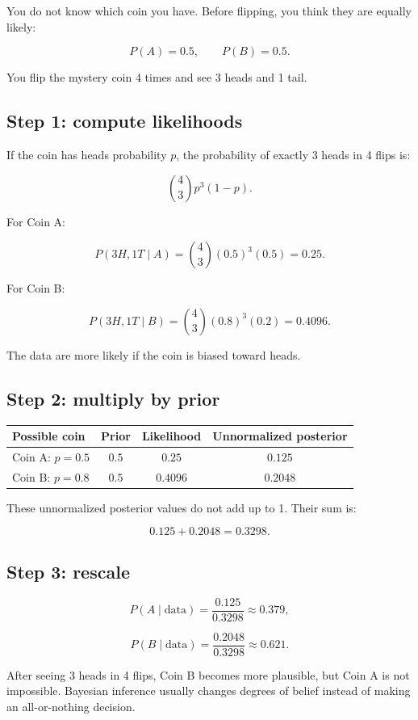 \documentclass[11pt]{article}
\newcommand{\data}{\text{data}}
\begin{document}
You do not know which coin you have. Before flipping, you think they are equally likely:

\[
P(A)=0.5, \qquad P(B)=0.5.
\]

You flip the mystery coin 4 times and see 3 heads and 1 tail.

\subsection*{Step 1: compute likelihoods}

If the coin has heads probability $p$, the probability of exactly 3 heads in 4 flips is:

\[
\binom{4}{3}p^3(1-p).
\]

For Coin A:

\[
P(3H,1T \mid A)=\binom{4}{3}(0.5)^3(0.5)=0.25.
\]

For Coin B:

\[
P(3H,1T \mid B)=\binom{4}{3}(0.8)^3(0.2)=0.4096.
\]

The data are more likely if the coin is biased toward heads.

\subsection*{Step 2: multiply by prior}

\begin{center}
\begin{tabular}{lccc}
\toprule
Possible coin & Prior & Likelihood & Unnormalized posterior \\
\midrule
Coin A: $p=0.5$ & $0.5$ & $0.25$ & $0.125$ \\
Coin B: $p=0.8$ & $0.5$ & $0.4096$ & $0.2048$ \\
\bottomrule
\end{tabular}
\end{center}

These unnormalized posterior values do not add up to 1. Their sum is:

\[
0.125+0.2048=0.3298.
\]

\subsection*{Step 3: rescale}

\[
P(A\mid \data)=\frac{0.125}{0.3298}\approx 0.379,
\]

\[
P(B\mid \data)=\frac{0.2048}{0.3298}\approx 0.621.
\]

\begin{bigidea}
After seeing 3 heads in 4 flips, Coin B becomes more plausible, but Coin A is not impossible. Bayesian inference usually changes degrees of belief instead of making an all-or-nothing decision.
\end{bigidea}
\end{document}
